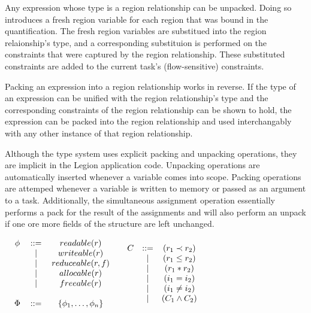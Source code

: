 Any expression whose type is a region relationship can be unpacked.  Doing so
introduces a fresh region variable for each region that was bound in the 
quantification.  The fresh region variables are substitued into the region
relaionship's type, and a corresponding substituion is performed on the
constraints that were captured by the region relationship.  These substituted
constraints are added to the current task's (flow-sensitive) constraints.

Packing an expression into a region relationship works in reverse.  If the type
of an expression can be unified with the region relationship's type and the
corresponding constraints of the region relationship can be shown to hold, the
expression can be packed into the region relationship and used interchangably
with any other instance of that region relationship.

Although the type system uses explicit packing and unpacking operations, they 
are implicit in the Legion application code.  Unpacking operations are 
automatically inserted whenever a variable comes into scope.  Packing operations
are attemped whenever a variable is written to memory or passed as an argument
to a task.  Additionally, the simultaneous assignment operation essentially
performs a pack for the result of the assignments and will also perform an
unpack if one ore more fields of the structure are left unchanged.

\begin{table}
\centering
{\small
\begin{math}
\begin{array}{cc}
\begin{tabular}{ccc}
$\phi$ & ::= & $readable(r)$ \\
  &$\mid$&$writeable(r)$ \\
  &$\mid$&$reduceable(r,f)$ \\
  &$\mid$&$allocable(r)$ \\
  &$\mid$&$freeable(r)$ \\
\\
$\Phi$ & ::= & $\{ \phi_1, \ldots, \phi_n \}$
\end{tabular}
&
\begin{array}{ccc}
C & ::= & (r_1 \prec r_2) \\
  &\mid&(r_1 \le r_2) \\
  &\mid&(r_1 * r_2) \\
  &\mid&(i_1 = i_2) \\
  &\mid&(i_1 \ne i_2) \\
  &\mid&(C_1 \wedge C_2) \\
\end{array}
\end{array}
\end{math}
}
\label{tbl:priv_const}
\caption{Privileges and Constraints}
\end{table}

